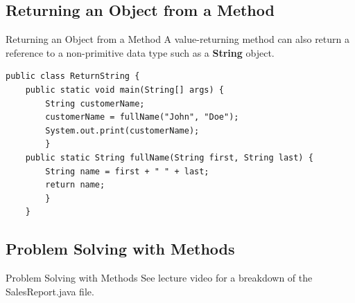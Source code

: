 \documentclass[11pt]{beamer}
\newcommand{\violet}[1]{\textcolor{violet}{#1}}
\begin{document}
\subsection{Returning an Object from a Method}
\begin{frame}[fragile]{Returning an Object from a Method}
A value-returning method can also return a reference to a non-primitive data type such as a \textbf{String} object.
\begin{lstlisting}
public class ReturnString {
    public static void main(String[] args) {
        String customerName;
        customerName = fullName("John", "Doe");
        System.out.print(customerName);
        }
    public static String fullName(String first, String last) {
        String name = first + " " + last;
        return name;
        }
    }
\end{lstlisting}
\end{frame}

\subsection{Problem Solving with Methods}
\begin{frame}{Problem Solving with Methods}
See lecture video for a breakdown of the SalesReport.java file.
\end{frame}


\end{document}

